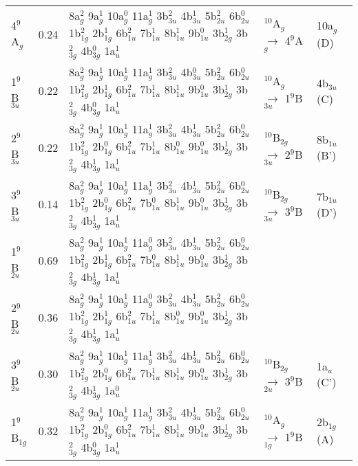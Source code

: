 \begin{refsection}
\begin{center}
\begin{landscape}
\begin{longtable}{@{\extracolsep{\fill}}lllll}
	4$^9$A$_g$       & 0.24 & 8a$_g^2$ 9a$_g^1$ 10a$_g^0$ 11a$_g^1$ 3b$_{3u}^2$ 4b$_{3u}^1$ 5b$_{2u}^2$ 6b$_{2u}^0$ 1b$_{1g}^2$ 2b$_{1g}^1$ 6b$_{1u}^2$ 7b$_{1u}^1$ 8b$_{1u}^1$ 9b$_{1u}^0$ 3b$_{2g}^1$ 3b$_{3g}^2$ 4b$_{3g}^0$ 1a$_u^1$ & $^{10}$A$_g$    $\longrightarrow$ 4$^9$A$_g$       & 10a$_g$ (D)    \\
	1$^9$B$_{3u}$    & 0.22 & 8a$_g^2$ 9a$_g^1$ 10a$_g^1$ 11a$_g^1$ 3b$_{3u}^2$ 4b$_{3u}^0$ 5b$_{2u}^2$ 6b$_{2u}^0$ 1b$_{1g}^2$ 2b$_{1g}^1$ 6b$_{1u}^2$ 7b$_{1u}^1$ 8b$_{1u}^1$ 9b$_{1u}^0$ 3b$_{2g}^1$ 3b$_{3g}^2$ 4b$_{3g}^0$ 1a$_u^1$ & $^{10}$A$_g$    $\longrightarrow$  1$^9$B$_{3u}$    & 4b$_{3u}$ (C)    \\
	2$^9$B$_{3u}$    & 0.22 & 8a$_g^2$ 9a$_g^1$ 10a$_g^1$ 11a$_g^1$ 3b$_{3u}^2$ 4b$_{3u}^1$ 5b$_{2u}^2$ 6b$_{2u}^0$ 1b$_{1g}^2$ 2b$_{1g}^0$ 6b$_{1u}^2$ 7b$_{1u}^1$ 8b$_{1u}^0$ 9b$_{1u}^0$ 3b$_{2g}^1$ 3b$_{3g}^2$ 4b$_{3g}^1$ 1a$_u^1$ & $^{10}$B$_{2g}$  $\longrightarrow$ 2$^9$B$_{3u}$    & 8b$_{1u}$ (B')   \\
	3$^9$B$_{3u}$    & 0.14 & 8a$_g^2$ 9a$_g^1$ 10a$_g^1$ 11a$_g^1$ 3b$_{3u}^2$ 4b$_{3u}^1$ 5b$_{2u}^2$ 6b$_{2u}^0$ 1b$_{1g}^2$ 2b$_{1g}^0$ 6b$_{1u}^2$ 7b$_{1u}^0$ 8b$_{1u}^1$ 9b$_{1u}^0$ 3b$_{2g}^1$ 3b$_{3g}^2$ 4b$_{3g}^1$ 1a$_u^1$ & $^{10}$B$_{2g}$ $\longrightarrow$ 3$^9$B$_{3u}$    & 7b$_{1u}$ (D')   \\
	1$^9$B$_{2u}$    & 0.69 & 8a$_g^2$ 9a$_g^1$ 10a$_g^1$ 11a$_g^0$ 3b$_{3u}^2$ 4b$_{3u}^1$ 5b$_{2u}^2$ 6b$_{2u}^0$ 1b$_{1g}^2$ 2b$_{1g}^1$ 6b$_{1u}^2$ 7b$_{1u}^0$ 8b$_{1u}^1$ 9b$_{1u}^0$ 3b$_{2g}^1$ 3b$_{3g}^2$ 4b$_{3g}^1$ 1a$_u^1$ &                &             \\                    
	2$^9$B$_{2u}$    & 0.36 & 8a$_g^2$ 9a$_g^1$ 10a$_g^1$ 11a$_g^0$ 3b$_{3u}^2$ 4b$_{3u}^1$ 5b$_{2u}^2$ 6b$_{2u}^0$ 1b$_{1g}^2$ 2b$_{1g}^1$ 6b$_{1u}^2$ 7b$_{1u}^1$ 8b$_{1u}^0$ 9b$_{1u}^0$ 3b$_{2g}^1$ 3b$_{3g}^2$ 4b$_{3g}^1$ 1a$_u^1$ &                &             \\                    
	3$^9$B$_{2u}$    & 0.30 & 8a$_g^2$ 9a$_g^1$ 10a$_g^1$ 11a$_g^1$ 3b$_{3u}^2$ 4b$_{3u}^1$ 5b$_{2u}^2$ 6b$_{2u}^0$ 1b$_{1g}^2$ 2b$_{1g}^0$ 6b$_{1u}^2$ 7b$_{1u}^1$ 8b$_{1u}^1$ 9b$_{1u}^0$ 3b$_{2g}^1$ 3b$_{3g}^2$ 4b$_{3g}^1$ 1a$_u^0$ & $^{10}$B$_{2g}$ $\longrightarrow$ 3$^9$B$_{2u}$    & 1a$_u$ (C')    \\
	1$^9$B$_{1g}$    & 0.32 & 8a$_g^2$ 9a$_g^1$ 10a$_g^1$ 11a$_g^1$ 3b$_{3u}^2$ 4b$_{3u}^1$ 5b$_{2u}^2$ 6b$_{2u}^0$ 1b$_{1g}^2$ 2b$_{1g}^0$ 6b$_{1u}^2$ 7b$_{1u}^1$ 8b$_{1u}^1$ 9b$_{1u}^0$ 3b$_{2g}^1$ 3b$_{3g}^2$ 4b$_{3g}^0$ 1a$_u^1$ & $^{10}$A$_g$    $\longrightarrow$ 1$^9$B$_{1g}$    & 2b$_{1g}$ (A)    \\

\end{longtable}
\end{landscape}
\end{center}
\end{refsection}
